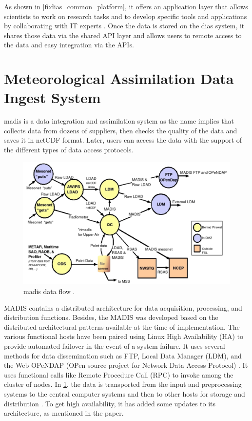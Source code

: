 As shown in \cref{fi:dias_common_platform}, it offers an application layer that allows scientists to work on research tasks and to develop specific tools and applications by collaborating with IT experts \cite{Kawasaki2018DataReduction}. Once the data is stored on the \acrshort{dias} system, it shares those data via the shared API layer and allows users to remote access to the data and easy integration via the APIs.


\section{Meteorological Assimilation Data Ingest System}
\label{se:madis}

\acrfull{madis} \cite{Macdermaid2005ArchitectureP2.39} is a data integration and assimilation system as the name implies that collects data from dozens of suppliers, then checks the quality of the data and saves it in \acrshort{netCDF} format. Later, users can access the data with the support of the different types of data access protocols.

\begin{figure}[htp]
    \centering
    \includegraphics[width=1\textwidth]{lit/other/madis_flow.png}
    \caption[\acrshort{madis} data flow]{\acrshort{madis} data flow \cite{Macdermaid2005ArchitectureP2.39}.}
    \label{fi:madis_flow}
\end{figure}

MADIS contains a distributed architecture for data acquisition, processing, and distribution functions. Besides, the MADIS was developed based on the distributed architectural patterns available at the time of implementation. The various functional hosts have been paired using Linux High Availability (HA) to provide automated failover in the event of a system failure. It uses several methods for data dissemination such as FTP, Local Data Manager (LDM), and the Web OPeNDAP (OPen source project for Network Data Access Protocol) \cite{Macdermaid2005ArchitectureP2.39}. It uses functional calls like Remote Procedure Call (RPC) to invoke among the cluster of nodes. In \cref{fi:madis_flow}, the data is transported from the input and preprocessing systems to the central computer systems and then to other hosts for storage and distribution \cite{Macdermaid2005ArchitectureP2.39}. To get high availability, it has added some updates to its architecture, as mentioned in the paper.

